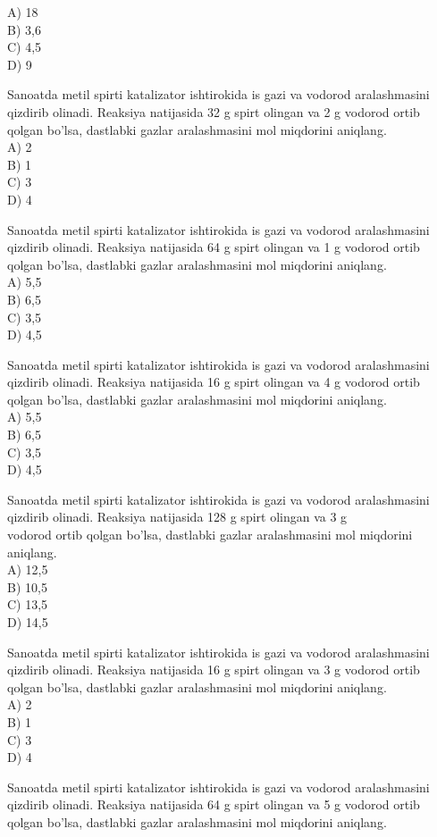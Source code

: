 A) 18\\
B) 3,6\\
C) 4,5\\
D) 9
  \item Sanoatda metil spirti katalizator ishtirokida is gazi va vodorod aralashmasini qizdirib olinadi. Reaksiya natijasida 32 g spirt olingan va 2 g vodorod ortib qolgan bo'lsa, dastlabki gazlar aralashmasini mol miqdorini aniqlang.\\
A) 2\\
B) 1\\
C) 3\\
D) 4
  \item Sanoatda metil spirti katalizator ishtirokida is gazi va vodorod aralashmasini qizdirib olinadi. Reaksiya natijasida 64 g spirt olingan va 1 g vodorod ortib qolgan bo'lsa, dastlabki gazlar aralashmasini mol miqdorini aniqlang.\\
A) 5,5\\
B) 6,5\\
C) 3,5\\
D) 4,5
  \item Sanoatda metil spirti katalizator ishtirokida is gazi va vodorod aralashmasini qizdirib olinadi. Reaksiya natijasida 16 g spirt olingan va 4 g vodorod ortib qolgan bo'lsa, dastlabki gazlar aralashmasini mol miqdorini aniqlang.\\
A) 5,5\\
B) 6,5\\
C) 3,5\\
D) 4,5
  \item Sanoatda metil spirti katalizator ishtirokida is gazi va vodorod aralashmasini qizdirib olinadi. Reaksiya natijasida 128 g spirt olingan va 3 g\\
vodorod ortib qolgan bo'lsa, dastlabki gazlar aralashmasini mol miqdorini aniqlang.\\
A) 12,5\\
B) 10,5\\
C) 13,5\\
D) 14,5
  \item Sanoatda metil spirti katalizator ishtirokida is gazi va vodorod aralashmasini qizdirib olinadi. Reaksiya natijasida 16 g spirt olingan va 3 g vodorod ortib qolgan bo'lsa, dastlabki gazlar aralashmasini mol miqdorini aniqlang.\\
A) 2\\
B) 1\\
C) 3\\
D) 4
  \item Sanoatda metil spirti katalizator ishtirokida is gazi va vodorod aralashmasini qizdirib olinadi. Reaksiya natijasida 64 g spirt olingan va 5 g vodorod ortib qolgan bo'lsa, dastlabki gazlar aralashmasini mol miqdorini aniqlang.\\
